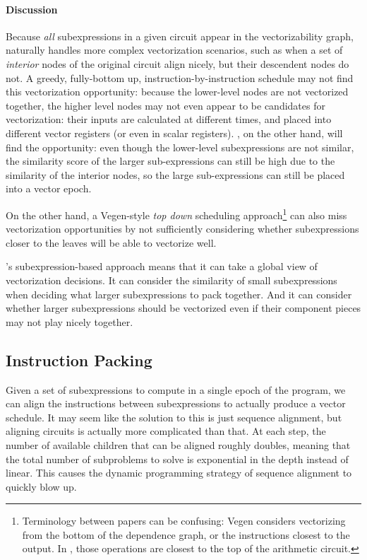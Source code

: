 \paragraph{Discussion} Because {\em all} subexpressions in a given circuit appear in the vectorizability graph, \system naturally handles more complex vectorization scenarios, such as when a set of {\em interior} nodes of the original circuit align nicely, but their descendent nodes do not. 
A greedy, fully-bottom up, instruction-by-instruction schedule may not find this vectorization opportunity: because the lower-level nodes are not vectorized together, the higher level nodes may not even appear to be candidates for vectorization: their inputs are calculated at different times, and placed into different vector registers (or even in scalar registers).
\system, on the other hand, will find the opportunity: even though the lower-level subexpressions are not similar, the similarity score of the larger sub-expressions can still be high due to the similarity of the interior nodes, so the large sub-expressions can still be placed into a vector epoch.

On the other hand, a Vegen-style {\em top down} scheduling approach\footnote{Terminology between papers can be confusing: Vegen considers vectorizing from the bottom of the dependence graph, or the instructions closest to the output. In \system, those operations are closest to the top of the arithmetic circuit.} can also miss vectorization opportunities by not sufficiently considering whether subexpressions closer to the leaves will be able to vectorize well.

\system's subexpression-based approach means that it can take a global view of vectorization decisions. 
It can consider the similarity of small subexpressions when deciding what larger subexpressions to pack together. 
And it can consider whether larger subexpressions should be vectorized even if their component pieces may not play nicely together.

\subsection{Instruction Packing}\label{sec:instruction-packing}
Given a set of subexpressions to compute in a single epoch of the program, we can align the instructions between subexpressions to actually produce a vector schedule.
It may seem like the solution to this is just sequence alignment, but aligning circuits is actually more complicated than that.
At each step, the number of available children that can be aligned roughly doubles, meaning that the total number of subproblems to solve is exponential in the depth instead of linear. 
This causes the dynamic programming strategy of sequence alignment to quickly blow up.

